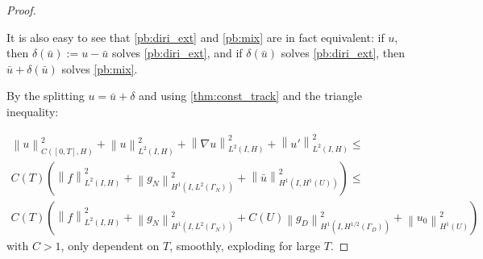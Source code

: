 \documentclass[english,a4paper,10pt,oneside]{scrbook}	%
\theoremstyle{break}
\newenvironment{mproof}[1][\proofname]{%
  \begin{proof}[#1]$ $\par\nobreak\ignorespaces
}{%
  \end{proof}
}
\renewcommand*{\proofname}{Proof}
\theoremstyle{remark}
\newcommand{\norm}[1]{\left\lVert#1\right\rVert}
\begin{document}
\begin{appendices}
\begin{mproof}
It is also easy to see that \cref{pb:diri_ext} and \cref{pb:mix} are in fact equivalent: if $u$, then $\delta(\bar{u}):=u-\bar{u}$ solves \cref{pb:diri_ext}, and if $\delta(\bar{u})$ solves  \cref{pb:diri_ext}, then $\bar{u}+\delta(\bar{u})$ solves \cref{pb:mix}.

By the splitting $u=\bar{u} + \delta$ and using \cref{thm:const_track} and the triangle inequality:

\begin{align*}
	\norm{u}_{C([0,T],H)}^2 + \norm{u}^2_{L^2(I,H)}+\norm{\nabla u}^2_{L^2(I,H)} + \norm{u'}^2_{L^2(I,H)} \leq \\
	C(T)\left (  \norm{f}_{L^2(I,H)}^2 +  \norm{g_N}^2_{H^1(I,L^2(\Gamma_N))}  + \norm{\bar{u}}^2_{H^1(I,H^1(U))}\right )  \leq \\
	C(T)\left (  \norm{f}_{L^2(I,H)}^2 +  \norm{g_N}^2_{H^1(I,L^2(\Gamma_N))} + C(U) \norm{g_D}^2_{H^1(I,H^{1/2}(\Gamma_D))} + \norm{u_0}^2_{H^1(U)}\right )
\end{align*} 
with $C>1$, only dependent on $T$, smoothly, exploding for large $T$.

\end{mproof}
\end{appendices}
\end{document}
